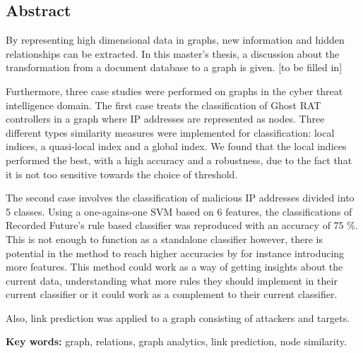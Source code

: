 
\noindent
\begin{comment}
\thesistitle\\
\thesissubtitle\\
\whatthisis\\
\\
\large{%
    Henrik Adolfsson\\
	Josephine Cuellar Andersson\\
}\\
\\
\large{%
	\whereandwhen
}
\vfill
\end{comment}

\begin{center}
    \section*{Abstract}
\end{center}
By representing high dimensional data in graphs, new information and hidden relationships can be extracted. In this master's thesis, a discussion about the transformation from a document database to a graph is given. [to be filled in] 

Furthermore, three case studies were performed on graphs in the cyber threat intelligence domain. The first case treats the classification of Ghost RAT controllers in a graph where IP addresses are represented as nodes. Three different types similarity measures were implemented for classification: local indices, a quasi-local index and a global index. We found that the local indices performed the best, with a high accuracy and a robustness, due to the fact that it is not too sensitive towards the choice of threshold. 

The second case involves the classification of malicious IP addresses divided into 5 classes. Using a one-agains-one SVM based on 6 features, the classifications of Recorded Future's rule based classifier was reproduced with an accuracy of 75 \%. This is not enough to function as a standalone classifier however, there is potential in the method to reach higher accuracies by for instance introducing more features. This method could work as a way of getting insights about the current data, understanding what more rules they should implement in their current classifier or it could work as a complement to their current classifier.

Also, link prediction was applied to a graph consisting of attackers and targets. 


\noindent
\textbf{Key words:} graph, relations, graph analytics, link prediction, node similarity.